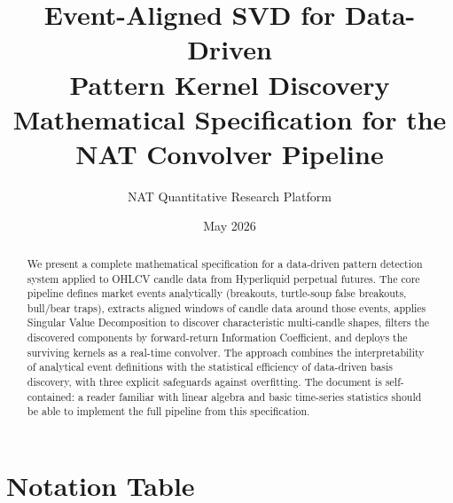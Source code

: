\documentclass[11pt,a4paper]{article}
\theoremstyle{definition}
\theoremstyle{plain}
\begin{document}
\title{\textbf{Event-Aligned SVD for Data-Driven\\[4pt] Pattern Kernel Discovery}\\
       \large Mathematical Specification for the NAT Convolver Pipeline}
\author{NAT Quantitative Research Platform}
\date{May 2026}
\maketitle

\begin{abstract}
We present a complete mathematical specification for a data-driven pattern detection
system applied to OHLCV candle data from Hyperliquid perpetual futures. The core pipeline
defines market events analytically (breakouts, turtle-soup false breakouts, bull/bear
traps), extracts aligned windows of candle data around those events, applies Singular
Value Decomposition to discover characteristic multi-candle shapes, filters the
discovered components by forward-return Information Coefficient, and deploys the
surviving kernels as a real-time convolver. The approach combines the interpretability of
analytical event definitions with the statistical efficiency of data-driven basis
discovery, with three explicit safeguards against overfitting. The document is
self-contained: a reader familiar with linear algebra and basic time-series statistics
should be able to implement the full pipeline from this specification.
\end{abstract}

\tableofcontents
\bigskip

\section{Notation Table}
\end{document}
